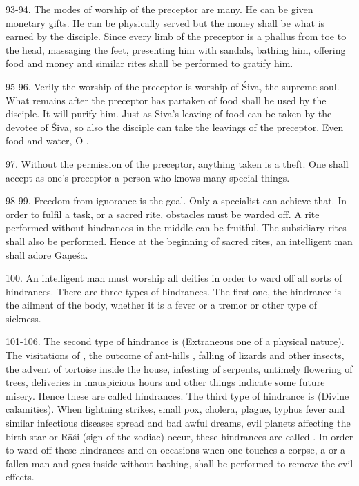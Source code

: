 93-94. The modes of worship of the preceptor are many. He can be given monetary
gifts. He can be physically served but the money shall be what is earned by
the disciple. Since every limb of the preceptor is a phallus from toe to
the head, massaging the feet, presenting him with sandals, bathing him, offering
food and money and similar rites shall be performed to gratify him.

95-96. Verily the worship of the preceptor is worship of Śiva, the supreme soul.
What remains after the preceptor has partaken of food shall be used by
the disciple. It will purify him. Just as Siva’s leaving of food can be taken by
the devotee of Śiva, so also the disciple can take the leavings of the preceptor.
Even food and water, O .

97. Without the permission of the preceptor, anything taken is a theft. One
shall accept as one’s preceptor a person who knows many special things.

98-99. Freedom from ignorance is the goal. Only a specialist can achieve that.
In order to fulfil a task, or a sacred rite, obstacles must be warded off.
A rite performed without hindrances in the middle can be fruitful.
The subsidiary rites shall also be performed. Hence at the beginning of sacred
rites, an intelligent man shall adore Gaṇeśa.

100. An intelligent man must worship all deities in order to ward off all sorts
of hindrances. There are three types of hindrances. The first one,
the  hindrance is the ailment of the body, whether it is a fever
or a tremor or other type of sickness.

101-106. The second type of hindrance is  (Extraneous one of
a physical nature). The visitations of , the outcome of ant-hills
\etc, falling of lizards and other insects, the advent of tortoise inside
the house, infesting of serpents, untimely flowering of trees, deliveries in
inauspicious hours and other things indicate some future misery. Hence these are
called  hindrances. The third type of hindrance is
 (Divine calamities). When lightning strikes, small pox, cholera,
plague, typhus fever and similar infectious diseases spread and bad awful dreams,
evil planets affecting the birth star or Rāśi (sign of the zodiac) occur, these
hindrances are called . In order to ward off these hindrances
and on occasions when one touches a corpse, a  or a fallen man and
goes inside without bathing,  shall be performed to remove
the evil effects.

